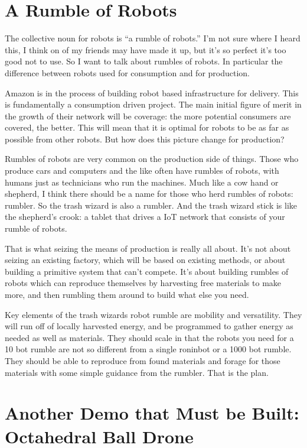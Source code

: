 \section{A Rumble of Robots}\label{a-rumble-of-robots}

The collective noun for robots is ``a rumble of robots.'' I'm not sure
where I heard this, I think on of my friends may have made it up, but
it's so perfect it's too good not to use. So I want to talk about
rumbles of robots. In particular the difference between robots used for
consumption and for production.

Amazon is in the process of building robot based infrastructure for
delivery. This is fundamentally a consumption driven project. The main
initial figure of merit in the growth of their network will be coverage:
the more potential consumers are covered, the better. This will mean
that it is optimal for robots to be as far as possible from other
robots. But how does this picture change for production?

Rumbles of robots are very common on the production side of things.
Those who produce cars and computers and the like often have rumbles of
robots, with humans just as technicians who run the machines. Much like
a cow hand or shepherd, I think there should be a name for those who
herd rumbles of robots: rumbler. So the trash wizard is also a rumbler.
And the trash wizard stick is like the shepherd's crook: a tablet that
drives a IoT network that consists of your rumble of robots.

That is what seizing the means of production is really all about. It's
not about seizing an existing factory, which will be based on existing
methods, or about building a primitive system that can't compete. It's
about building rumbles of robots which can reproduce themselves by
harvesting free materials to make more, and then rumbling them around to
build what else you need.

Key elements of the trash wizards robot rumble are mobility and
versatility. They will run off of locally harvested energy, and be
programmed to gather energy as needed as well as materials. They should
scale in that the robots you need for a 10 bot rumble are not so
different from a single roninbot or a 1000 bot rumble. They should be
able to reproduce from found materials and forage for those materials
with some simple guidance from the rumbler. That is the plan.

\section{Another Demo that Must be Built: Octahedral Ball
Drone}\label{another-demo-that-must-be-built-octahedral-ball-drone}

